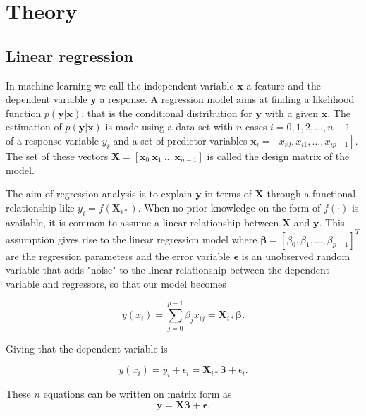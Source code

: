 

\section{Theory}
\subsection{Linear regression}
In machine learning we call the independent variable $\mathbf{x}$ a feature and the dependent variable $\mathbf{y}$ a response. A regression model aims at finding a likelihood function $p(\mathbf{y}|\mathbf{x})$, that is the conditional distribution for $\mathbf{y}$ with a given $\mathbf{x}$. The estimation of $p(\mathbf{y}|\mathbf{x})$ is made using a data set with $n$ cases $i=0,1,2,...,n-1$ of a response variable $y_i$ and a set of predictor variables $\mathbf{x}_i=[x_{i0}, x_{i1},...,x_{ip-1}]$. The set of these vectors $\mathbf{X}=[\mathbf{x}_{0}\ \mathbf{x}_{1}\ ...\ \mathbf{x}_{n-1}]$ is called the design matrix of the model. 


The aim of regression analysis is to explain $\mathbf y$ in terms of $\mathbf X$ through a functional relationship like $y_i=f(\mathbf{X}_{i*})$. When no prior knowledge on the form of $f( \cdot )$ is available, it is common to assume a linear relationship between $\mathbf{X}$ and $\mathbf{y}$. This assumption gives rise to the linear regression model where $\boldsymbol\beta=\left[\beta_0, \beta_1, ..., \beta_{p-1} \right]^T$ are the regression parameters and the error variable $\boldsymbol\epsilon$ is an unobserved random variable that adds "noise" to the linear relationship between the dependent variable and regressors, so that our model becomes

$$
\tilde{y}(x_i) = \sum_{j=0}^{p-1} \beta_j x_{ij}=\mathbf X_{i*}\boldsymbol{\beta}.
$$

Giving that the dependent variable is

$$
y(x_i) = \tilde{y}_i + \epsilon_i = \mathbf X_{i*}\boldsymbol{\beta} + \epsilon_i.
$$

These $n$ equations can be written on matrix form as
\begin{equation}\label{eq:linear_regression}
    \mathbf{y} = \mathbf{X}\boldsymbol{\beta} + \boldsymbol{\epsilon}.
\end{equation}

